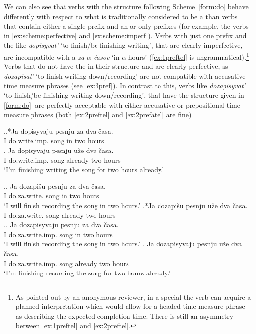 We can also see that verbs with the structure following Scheme~\ref{form:do} behave differently with respect to what is traditionally considered to be a  than verbs that contain either a single prefix and an  or only prefixes (for example, the verbs in \ref{ex:scheme:perfective} and \ref{ex:scheme:imperf}). Verbs with just one prefix and the  like \textit{dopisyvat'} `to finish/be finishing writing', that are clearly imperfective, are incompatible with a  \textit{za $\alpha$ \v{c}asov} `in $\alpha$ hours' (\ref{ex:1preftel} is ungrammatical).\footnote{As pointed out by an anonymous reviewer, in a special  the verb can acquire a planned  interpretation which would allow for a headed time measure phrase as describing the expected completion time. There is still an asymmetry between \ref{ex:1preftel} and \ref{ex:2preftel}.} Verbs that do not have the  in their structure and are clearly perfective, as \textit{dozapisat'} `to finish writing down/recording' are not compatible with accusative time measure phrases (see \ref{ex:3pref}). In contrast to this, verbs like \textit{dozapisyvat'} `to finish/be finishing writing down/recording', that have the structure given in \ref{form:do}, are perfectly acceptable with either accusative or prepositional time measure phrases (both \ref{ex:2preftel} and \ref{ex:2prefatel} are fine).

\ex.\label{ex:1pref}\ag.*Ja dopisyvaju pesnju za dva \v{c}asa.\label{ex:1preftel}\\
I do.write.imp. song in two hours\\
\bg. \label{ex:1prefatel}Ja dopisyvaju pesnju u\v{z}e dva \v{c}asa.\\
I do.write.imp. song already two hours\\
\trans `I'm finishing writing the song for two hours already.'

\ex.\label{ex:3pref}\ag. \label{ex:3preftel}Ja dozapi\v{s}u pesnju za dva \v{c}asa.\\
I do.za.write. song in two hours\\
\trans `I will finish recording the song in two hours.'
\bg.*Ja dozapi\v{s}u pesnju u\v{z}e dva \v{c}asa.\label{ex:3prefatel}\\
I do.za.write. song already two hours\\

\ex.\label{ex:2pref}\ag. \label{ex:2preftel}Ja dozapisyvaju pesnju za dva \v{c}asa.\\
I do.za.write.imp. song in two hours\\
\trans `I will finish recording the song in two hours.'
\bg. \label{ex:2prefatel}Ja dozapisyvaju pesnju u\v{z}e dva \v{c}asa.\\
I do.za.write.imp. song already two hours\\
\trans `I'm finishing recording the song for two hours already.'

